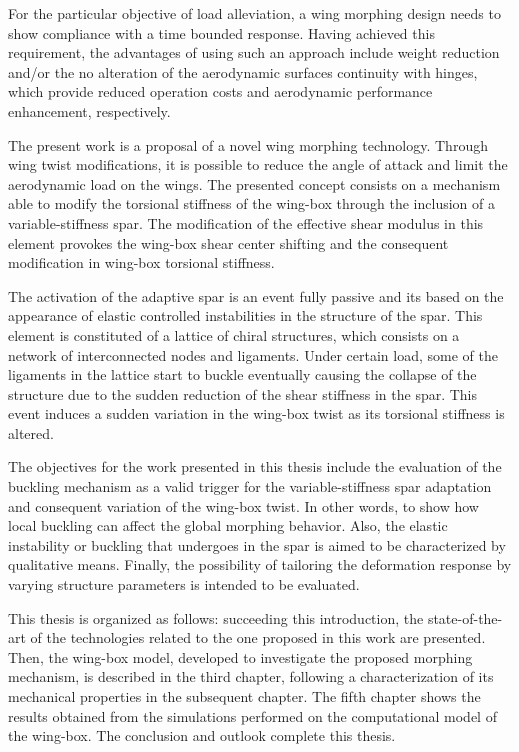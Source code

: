 For the particular objective of load alleviation, a wing morphing design needs to show compliance with a time bounded response. Having achieved this requirement, the advantages of using such an approach include weight reduction and/or the no alteration of the aerodynamic surfaces continuity with hinges, which provide reduced operation costs and aerodynamic performance enhancement, respectively.

The present work is a proposal of a novel wing morphing technology. Through wing twist modifications, it is possible to reduce the angle of attack and limit the aerodynamic load on the wings. The presented concept consists on a mechanism able to modify the torsional stiffness of the wing-box through the inclusion of a variable-stiffness spar. The modification of the effective shear modulus in this element provokes the wing-box shear center shifting and the consequent modification in wing-box torsional stiffness. 

The activation of the adaptive spar is an event fully passive and its based on the appearance of elastic controlled instabilities in the structure of the spar. This element is constituted of a lattice of chiral structures, which consists on a network of interconnected nodes and ligaments. Under certain load, some of the ligaments in the lattice start to buckle eventually causing the collapse of the structure due to the sudden reduction of the shear stiffness in the spar. This event induces a sudden variation in the wing-box twist as its torsional stiffness is altered.

The objectives for the work presented in this thesis include the evaluation of the buckling mechanism as a valid trigger for the variable-stiffness spar adaptation and consequent variation of the wing-box twist. In other words, to show how local buckling can affect the global morphing behavior. Also, the elastic instability or buckling that undergoes in the spar is aimed to be characterized by qualitative means. Finally, the possibility of tailoring the deformation response by varying structure parameters is intended to be evaluated. 

This thesis is organized as follows: succeeding this introduction, the state-of-the-art of the technologies related to the one proposed in this work are presented. Then, the wing-box model, developed to investigate the proposed morphing mechanism, is described in the third chapter, following a characterization of its mechanical properties in the subsequent chapter. The fifth chapter shows the results obtained from the simulations performed on the computational model of the wing-box. The conclusion and outlook complete this thesis.